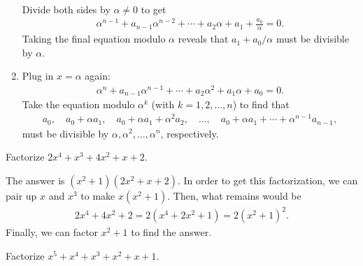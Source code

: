 \documentclass[12pt,a4paper]{memoir}
\theoremstyle{definition}
\begin{document}
\begin{solution}
\begin{enumerate}
\begin{align*}
			\end{align*}
			Divide both sides by $\alpha \neq 0$ to get
			\begin{align*}
				\alpha^{n-1} + a_{n-1}\alpha^{n-2} + \cdots + a_2\alpha + a_1 + \frac{a_0}{\alpha} = 0.
			\end{align*}
			Taking the final equation modulo $\alpha$ reveals that $a_1+a_0/\alpha$ must be divisible by $\alpha$.
			\item Plug in $x=\alpha$ again:
			\begin{align*}
				\alpha^n + a_{n-1}\alpha^{n-1} + \cdots + a_2\alpha^2 + a_1\alpha + a_0 = 0.
			\end{align*}
			Take the equation modulo $\alpha^k$ (with $k=1,2,\dots,n$) to find that 
			\begin{align*}
				a_0, \quad a_0+\alpha a_1, \quad a_0+\alpha a_1+\alpha^2 a_2, \quad\dots, \quad a_0+\alpha a_1+\cdots+\alpha^{n-1} a_{n-1},
			\end{align*}
			must be divisible by $\alpha, \alpha^2, \dots, \alpha^n$, respectively.
		\end{enumerate}
	\end{solution}

	
	
	\setcounter{question}{36}
	\begin{tcolorbox}
		\begin{question}
			Factorize $2x^4 + x^3 + 4x^2 + x + 2$.
		\end{question}
	\end{tcolorbox}
	
	\begin{solution}
		The answer is $(x^2+1)(2x^2+x+2)$. In order to get this factorization, we can pair up $x$ and $x^3$ to make $x(x^2+1)$. Then, what remains would be
		\begin{align*}
			2x^4+4x^2+2 = 2(x^4+2x^2+1) = 2(x^2+1)^2.
		\end{align*}
		Finally, we can factor $x^2+1$ to find the answer. 
	\end{solution}
	
	
	
	
	\begin{tcolorbox}
		\SetupExSheets{headings=runin}
		\begin{question}
			Factorize $x^5+x^4+x^3+x^2+x+1$.
		\end{question}
	\end{tcolorbox}
	
\end{document}
